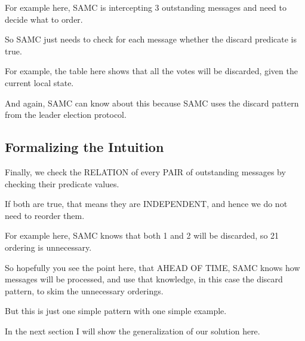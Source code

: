 For example here, SAMC is intercepting 3 outstanding messages and need to decide
what to order.

So SAMC just needs to check for each message whether the discard predicate is
true.

For example, the table here shows that all the votes will be discarded, given
the current local state.

And again, SAMC can know about this because SAMC uses the discard pattern from
the leader election protocol.

\subsection{Formalizing the Intuition}

Finally, we check the RELATION of every PAIR of outstanding messages by checking
their predicate values.

If both are true, that means they are INDEPENDENT, and hence we do not need to
reorder them.

For example here, SAMC knows that both 1 and 2 will be discarded, so 21 ordering
is unnecessary.

So hopefully you see the point here, that AHEAD OF TIME, SAMC knows how messages
will be processed, and use that knowledge, in this case the discard pattern, to
skim the unnecessary orderings.

But this is just one simple pattern with one simple example.

In the next section I will show the generalization of our solution here.

